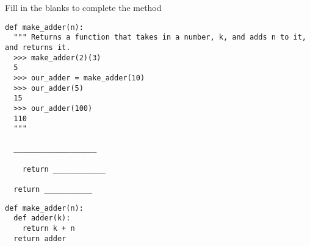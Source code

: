 \begin{blocksection}
\question Fill in the blanks to complete the method

\begin{lstlisting}
def make_adder(n):
  """ Returns a function that takes in a number, k, and adds n to it, and returns it.
  >>> make_adder(2)(3)
  5
  >>> our_adder = make_adder(10)
  >>> our_adder(5)
  15
  >>> our_adder(100)
  110
  """

  ___________________

    return ____________

  return ___________
\end{lstlisting}

\begin{solution}
\begin{lstlisting}
def make_adder(n):
  def adder(k):
    return k + n
  return adder
\end{lstlisting}
\end{solution}
\end{blocksection}
